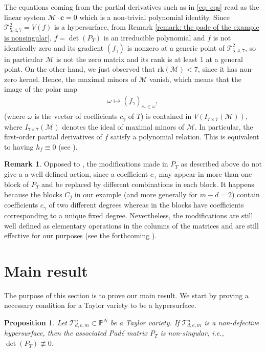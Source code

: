 \documentclass[letterpaper,11pt]{amsart}
\theoremstyle{plain}
\newtheorem{proposition}[theorem]{Proposition}
\theoremstyle{definition}
\newtheorem{remark}[theorem]{Remark}
\begin{document}
The equations coming from the partial derivatives such as in \cref{eq: eqs} read as the linear system $\mathcal M \cdot \bm{c}=0$ which is a non-trivial polynomial identity. Since $\mathcal{T}^2_{5,4,7} = V(f)$ is a hypersurface,  from Remark \ref{remark: the pade of the example is nonsingular},  $f = \det(P_T)$ is an irreducible polynomial and
$f$ is not identically zero and its gradient 
$(f_\gamma)$ is nonzero at a generic point 
of $\mathcal{T}^2_{5,4,7}$, so in particular $\mathcal M$ is not the zero matrix and its rank is at least $1$ at a general point. On the other hand, we just observed that $\mathrm{rk} (\mathcal M)<7$, since it has non-zero kernel. Hence,  
the maximal minors of $\mathcal{M}$ vanish, which means that the image of the polar map \begin{align*}
\omega \mapsto (f_{\gamma})_{c_{\gamma} \in \omega} ,   
\end{align*} (where $\omega$ is the vector of coefficients $c_{\gamma}$ of $T$) is contained in $V(I_{7 \times 7}(\mathcal{M})),$ where $I_{7 \times 7}(\mathcal{M})$ denotes the ideal of maximal minors of $\mathcal{M}.$ In particular, the first-order partial derivatives of $f$ satisfy a polynomial relation. This is equivalent to having $h_f\equiv 0$ (see \cite[\S 7.2.1]{R16}).  


\begin{remark}
Opposed to \cite[Theorem 4.4]{TV23}, the modifications made in $P_T$ as described above do not give a a well defined action, since a coefficient $c_{\gamma}$ may appear in more than one block of $P_T$ and be replaced by different combinations in each block. It happens because the blocks $C_j$ in our example (and more generally for $m-d=2$) contain coefficients $c_{\gamma}$ of two different degrees whereas in \cite[Theorem 4.4]{TV23} the blocks have coefficients corresponding to a unique fixed degree. Nevertheless, the modifications are still well defined as elementary operations in the columns of the matrices and are still effective for our purposes (see the forthcoming ).
\end{remark}    


\section{Main result}\label{section: main theorem} 
The purpose of this section is to prove our main result. We start by proving a necessary condition for a Taylor variety to be a hypersurface.
\begin{proposition}\label{nonsingular}
Let $\mathcal{T}^{n}_{d,e,m} \subset \mathbb{P}^N$ be a Taylor variety. If $\mathcal{T}^{n}_{d,e,m}$ is a non-defective hypersurface, then the associated Padé matrix $P_T$ is non-singular, i.e., $\det(P_T) \not\equiv 0$.
\end{proposition}
\end{document}
